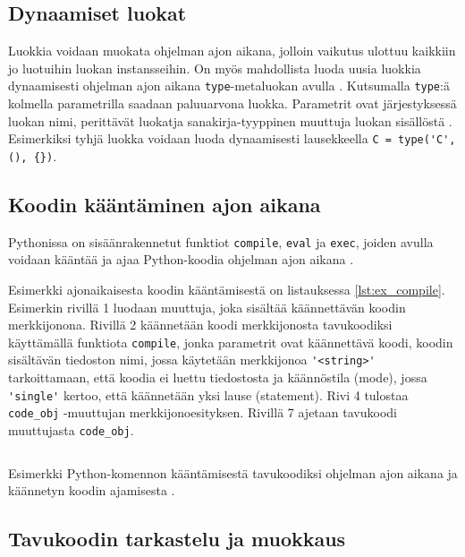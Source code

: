 \documentclass[finnish]{tktltiki2}
\theoremstyle{definition}
\theoremstyle{remark}
\begin{document}
\subsection{Dynaamiset luokat}

Luokkia voidaan muokata ohjelman ajon aikana, jolloin vaikutus ulottuu kaikkiin jo luotuihin luokan instansseihin. On myös mahdollista luoda uusia luokkia dynaamisesti ohjelman ajon aikana \verb|type|-metaluokan avulla \cite{python3meta}. Kutsumalla \verb|type|:ä kolmella parametrilla saadaan paluuarvona luokka. Parametrit ovat järjestyksessä luokan nimi, perittävät luokatja sanakirja-tyyppinen muuttuja luokan sisällöstä \cite{python3meta}. Esimerkiksi tyhjä luokka voidaan luoda dynaamisesti lausekkeella \verb|C = type('C', (), {})|.



\subsection{Koodin kääntäminen ajon aikana}

Pythonissa on sisäänrakennetut funktiot \verb|compile|, \verb|eval| ja \verb|exec|, joiden avulla voidaan kääntää ja ajaa Python-koodia ohjelman ajon aikana \cite{codeobjects,martelli2006python}.

Esimerkki ajonaikaisesta koodin kääntämisestä on listauksessa \ref{lst:ex_compile}. Esimerkin rivillä 1 luodaan muuttuja, joka sisältää käännettävän koodin merkkijonona. Rivillä 2 käännetään koodi merkkijonosta tavukoodiksi käyttämällä funktiota \verb|compile|, jonka parametrit ovat käännettävä koodi, koodin sisältävän tiedoston nimi, jossa käytetään merkkijonoa \verb|'<string>'| tarkoittamaan, että koodia ei luettu tiedostosta ja käännöstila (mode), jossa \verb|'single'| kertoo, että käännetään yksi lause (statement). Rivi 4 tulostaa \verb|code_obj| -muuttujan merkkijonoesityksen. Rivillä 7 ajetaan tavukoodi muuttujasta \verb|code_obj|.

\begin{listing}
    \inputminted[linenos]{python}{code/dynamichello.py}
    \caption{Esimerkki Python-komennon kääntämisestä tavukoodiksi ohjelman ajon aikana ja käännetyn koodin ajamisesta \cite{codeobjects}.}
    \label{lst:ex_compile}
\end{listing}


\subsection{Tavukoodin tarkastelu ja muokkaus}
\end{document}
